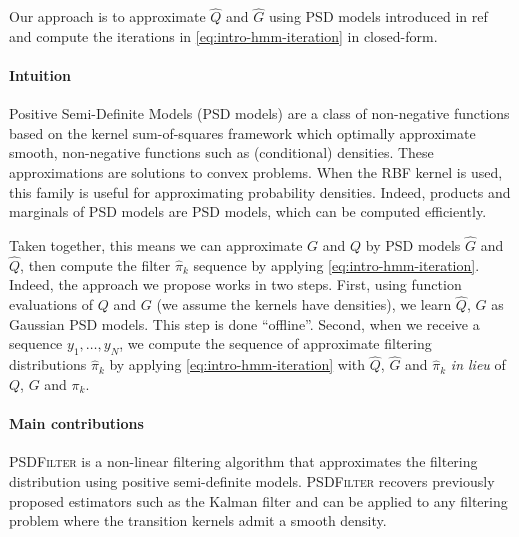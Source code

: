 Our approach is to approximate $\hat Q$ and $\hat G$ using PSD models introduced in ref and compute the iterations in \cref{eq:intro-hmm-iteration} in closed-form.

\paragraph{Intuition}
Positive Semi-Definite Models (PSD models) are a class of non-negative functions based on the kernel sum-of-squares framework which optimally approximate smooth, non-negative functions such as (conditional) densities. These approximations are solutions to convex problems. When the RBF kernel is used, this family is useful for approximating probability densities. Indeed, products and marginals of PSD models are PSD models, which can be computed efficiently.

Taken together, this means we can approximate $G$ and $Q$ by PSD models $\hat G$ and $\hat Q$, then compute the filter $\hat \pi_k$ sequence by applying \cref{eq:intro-hmm-iteration}. Indeed, the approach we propose works in two steps. First, using function evaluations of $Q$ and $G$ (we assume the kernels have densities), we learn $\hat Q$, $\hat G$ as Gaussian PSD models. This step is done ``offline''. Second, when we receive a sequence $y_1, \ldots, y_N$, we compute the sequence of approximate filtering distributions $\hat\pi_k$ by applying \cref{eq:intro-hmm-iteration} with $\hat Q$, $\hat G$ and $\hat \pi_k$ \emph{in lieu} of $Q$, $G$ and $\pi_k$.

\paragraph{Main contributions}
\textsc{PSDFilter} is a non-linear filtering algorithm that approximates the filtering distribution using positive semi-definite models. \textsc{PSDFilter} recovers previously proposed estimators such as the Kalman filter and can be applied to any filtering problem where the transition kernels admit a smooth density.

